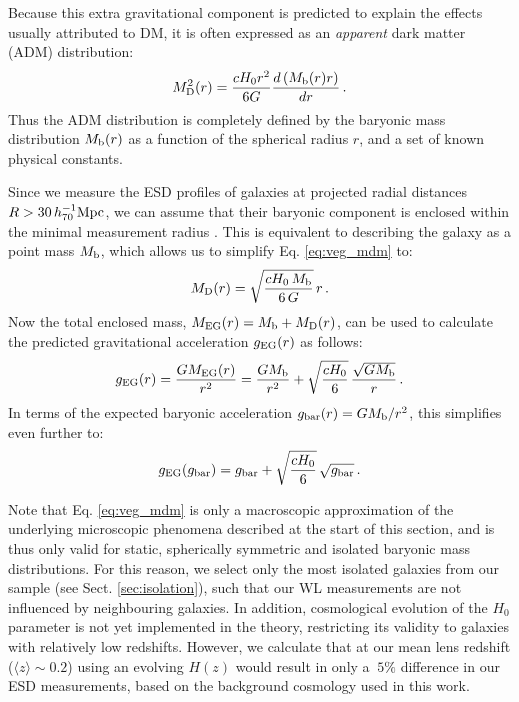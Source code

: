 \documentclass[usenatbib]{mnras}
\newcommand{\hsMpc}{\, h_{70}^{-1}{\rm{Mpc}} }
\newcommand{\un}[1]{_{\rm #1}}
\begin{document}
Because this extra gravitational component is predicted to explain the effects usually attributed to DM, it is often expressed as an \emph{apparent} dark matter (ADM) distribution:
\begin{equation}
M_{\rm D}^2 (r) = \frac{  cH_0 r^2}{6G} \frac{d\left( M_{\rm b}(r) r \right)}{dr} \, .
\label{eq:veg_mdm}
\end{equation}
Thus the ADM distribution is completely defined by the baryonic mass distribution $M\un{b}(r)$ as a function of the spherical radius $r$, and a set of known physical constants.

Since we measure the ESD profiles of galaxies at projected radial distances $R>30 \hsMpc$, we can assume that their baryonic component is enclosed within the minimal measurement radius \cite[see also][]{brouwer2017}. This is equivalent to describing the galaxy as a point mass $M\un{b}$, which allows us to simplify Eq. \ref{eq:veg_mdm} to:
\begin{equation}
M_{\rm D}(r)=\sqrt{\frac{cH_{0} \, M_{\rm b}}{6 \, G}} \, r \, .
\end{equation}
Now the total enclosed mass, $M\un{EG}(r) = M\un{b} + M\un{D}(r)$, can be used to calculate the predicted gravitational acceleration $g\un{EG}(r)$ as follows:
\begin{equation}
	g_{\rm EG}(r) = \frac{G M\un{EG}(r)}{r^2} = \frac{G M\un{b}}{r^2} + \sqrt{\frac{cH_{0}}{6}} \, \frac{\sqrt{G M_{\rm b}}}{r} \, .
\end{equation}
In terms of the expected baryonic acceleration $g\un{bar}(r) = G M\un{b}/r^2$, this simplifies even further to:
\begin{equation}
\label{eq:rar_verlinde}
g_{\rm EG}(g\un{bar}) = g\un{bar} + \sqrt{\frac{cH_{0}}{6}} \, \sqrt{g\un{bar}} \, .
\end{equation}

Note that Eq. \ref{eq:veg_mdm} is only a macroscopic approximation of the underlying microscopic phenomena described at the start of this section, and is thus only valid for static, spherically symmetric and isolated baryonic mass distributions. For this reason, we select only the most isolated galaxies from our sample (see Sect. \ref{sec:isolation}), such that our WL measurements are not influenced by neighbouring galaxies. In addition, cosmological evolution of the $H_0$ parameter is not yet implemented in the theory, restricting its validity to galaxies with relatively low redshifts. However, we calculate that at our mean lens redshift ($\langle z \rangle \sim 0.2$) using an evolving $H(z)$ would result in only a $~5\%$ difference in our ESD measurements, based on the background cosmology used in this work.
\end{document}

